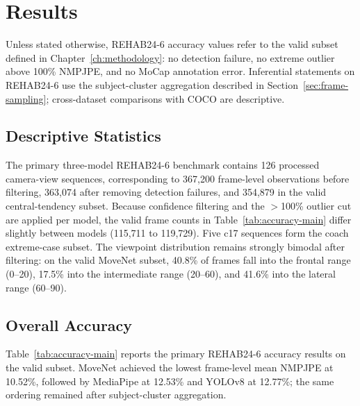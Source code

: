 \chapter{Results}
\label{ch:results}

Unless stated otherwise, REHAB24-6 accuracy values refer to the valid subset defined in Chapter~\ref{ch:methodology}: no detection failure, no extreme outlier above 100\% NMPJPE, and no MoCap annotation error. Inferential statements on REHAB24-6 use the subject-cluster aggregation described in Section~\ref{sec:frame-sampling}; cross-dataset comparisons with COCO are descriptive.

\section{Descriptive Statistics}
\label{sec:descriptive}

The primary three-model REHAB24-6 benchmark contains 126 processed camera-view sequences, corresponding to 367{,}200 frame-level observations before filtering, 363{,}074 after removing detection failures, and 354{,}879 in the valid central-tendency subset. Because confidence filtering and the $>$100\% outlier cut are applied per model, the valid frame counts in Table~\ref{tab:accuracy-main} differ slightly between models (115{,}711 to 119{,}729). Five c17 sequences form the coach extreme-case subset. The viewpoint distribution remains strongly bimodal after filtering: on the valid MoveNet subset, 40.8\% of frames fall into the frontal range (0--20\textdegree), 17.5\% into the intermediate range (20--60\textdegree), and 41.6\% into the lateral range (60--90\textdegree).

\section{Overall Accuracy}
\label{sec:accuracy}

Table~\ref{tab:accuracy-main} reports the primary REHAB24-6 accuracy results on the valid subset. MoveNet achieved the lowest frame-level mean NMPJPE at 10.52\%, followed by MediaPipe at 12.53\% and YOLOv8 at 12.77\%; the same ordering remained after subject-cluster aggregation.

